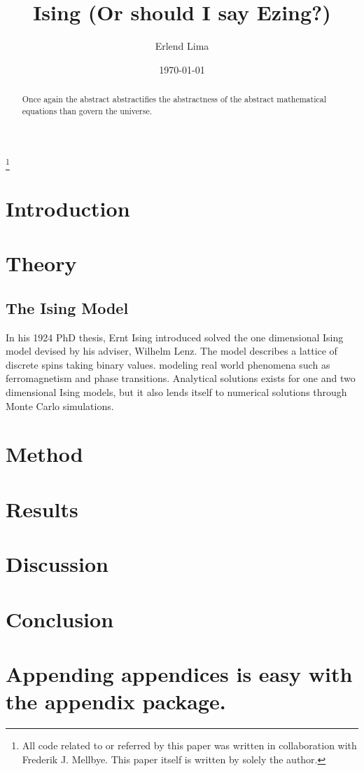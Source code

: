 \documentclass[aps,reprint]{revtex4-1}
\newcommand\blankpage{%
  \null
  \thispagestyle{empty}%
  \addtocounter{page}{-1}%
  \newpage}
\begin{document}
\title{Ising (Or should I say Ezing?)}
\author{Erlend Lima}
\thanks{All code related to or referred by this paper was written in
  collaboration with Frederik J. Mellbye. This paper itself is written by
 solely the author.}
\date{\today}

\begin{abstract}
Once again the abstract abstractifies the abstractness of the abstract mathematical
equations than govern the universe.
\end{abstract}
\maketitle
\tableofcontents
\makeatletter
\let\toc@pre\relax
\let\toc@post\relax
\makeatother

\newpage

\section{Introduction}
\label{sec:introduction}

\section{Theory}
\label{sec:theory}

\subsection{The Ising Model}
\label{sec:isingmodel}

In his 1924 PhD thesis, Ernt Ising introduced 
solved the one dimensional Ising model devised by his adviser, Wilhelm Lenz. The
model describes a lattice of discrete spins taking binary values. modeling real
world phenomena such as ferromagnetism and phase transitions. Analytical
solutions exists for one and two dimensional Ising models, but it also lends
itself to numerical solutions through Monte Carlo simulations. 



\section{Method}
\label{sec:method}

\section{Results}
\label{sec:results}

\section{Discussion}
\label{sec:discussion}

\section{Conclusion}
\label{sec:conclusion}


\blankpage
\appendix
\section{Appending appendices is easy with the appendix package.}
\blankpage
\end{document}
